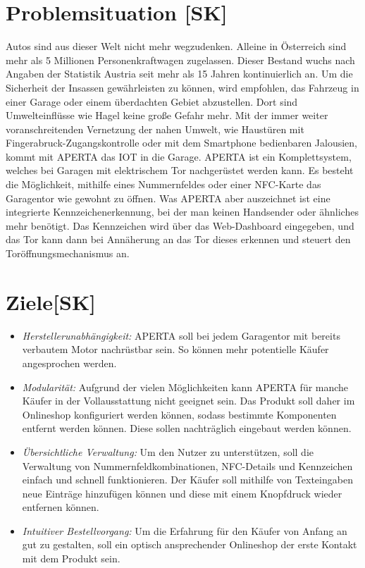\section{Problemsituation [SK]}
Autos sind aus dieser Welt nicht mehr wegzudenken. Alleine in Österreich sind mehr als 5 Millionen Personenkraftwagen zugelassen. Dieser Bestand wuchs nach Angaben der Statistik Austria seit mehr als 15 Jahren kontinuierlich an. Um die Sicherheit der Insassen gewährleisten zu können, wird empfohlen, das Fahrzeug in einer Garage oder einem überdachten Gebiet abzustellen. Dort sind Umwelteinflüsse wie Hagel keine große Gefahr mehr.
Mit der immer weiter voranschreitenden Vernetzung der nahen Umwelt, wie Haustüren mit Fingerabruck-Zugangskontrolle oder mit dem Smartphone bedienbaren Jalousien, kommt mit APERTA das IOT in die Garage.
APERTA ist ein Komplettsystem, welches bei Garagen mit elektrischem Tor nachgerüstet werden kann. Es besteht die Möglichkeit, mithilfe eines Nummernfeldes oder einer NFC-Karte das Garagentor wie gewohnt zu öffnen. Was APERTA aber auszeichnet ist eine integrierte Kennzeichenerkennung, bei der man keinen Handsender oder ähnliches mehr benötigt. Das Kennzeichen wird über das Web-Dashboard eingegeben, und das Tor kann dann bei Annäherung an das Tor dieses erkennen und steuert den Toröffnungsmechanismus an.

\section{Ziele[SK]}

\begin{itemize}
    \item \textit{Herstellerunabhängigkeit:} APERTA soll bei jedem Garagentor mit bereits verbautem Motor nachrüstbar sein. So können mehr potentielle Käufer angesprochen werden.
    \item \textit{Modularität:} Aufgrund der vielen Möglichkeiten kann APERTA für manche Käufer in der Vollausstattung nicht geeignet sein. Das Produkt soll daher im Onlineshop konfiguriert werden können, sodass bestimmte Komponenten entfernt werden können. Diese sollen nachträglich eingebaut werden können.
    \item \textit{Übersichtliche Verwaltung:} Um den Nutzer zu unterstützen, soll die Verwaltung von Nummernfeldkombinationen, NFC-Details und Kennzeichen einfach und schnell funktionieren. Der Käufer soll mithilfe von Texteingaben neue Einträge hinzufügen können und diese mit einem Knopfdruck wieder entfernen können.
    \item \textit{Intuitiver Bestellvorgang:}
    Um die Erfahrung für den Käufer von Anfang an gut zu gestalten, soll ein optisch ansprechender Onlineshop der erste Kontakt mit dem Produkt sein.
  \end{itemize}